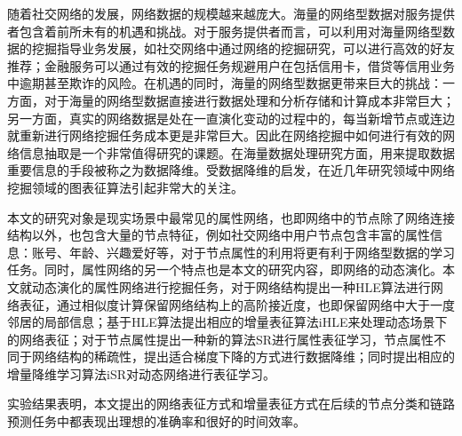 随着社交网络的发展，网络数据的规模越来越庞大。海量的网络型数据对服务提供者包含着前所未有的机遇和挑战。对于服务提供者而言，可以利用对海量网络型数据的挖掘指导业务发展，如社交网络中通过网络的挖掘研究，可以进行高效的好友推荐；金融服务可以通过有效的挖掘任务规避用户在包括信用卡，借贷等信用业务中逾期甚至欺诈的风险。在机遇的同时，海量的网络型数据更带来巨大的挑战：一方面，对于海量的网络型数据直接进行数据处理和分析存储和计算成本非常巨大；另一方面，真实的网络数据是处在一直演化变动的过程中的，每当新增节点或连边就重新进行网络挖掘任务成本更是非常巨大。因此在网络挖掘中如何进行有效的网络信息抽取是一个非常值得研究的课题。在海量数据处理研究方面，用来提取数据重要信息的手段被称之为数据降维。受数据降维的启发，在近几年研究领域中网络挖掘领域的图表征算法引起非常大的关注。

本文的研究对象是现实场景中最常见的属性网络，也即网络中的节点除了网络连接结构以外，也包含大量的节点特征，例如社交网络中用户节点包含丰富的属性信息：账号、年龄、兴趣爱好等，对于节点属性的利用将更有利于网络型数据的学习任务。同时，属性网络的另一个特点也是本文的研究内容，即网络的动态演化。本文就动态演化的属性网络进行挖掘任务，对于网络结构提出一种HLE算法进行网络表征，通过相似度计算保留网络结构上的高阶接近度，也即保留网络中大于一度邻居的局部信息；基于HLE算法提出相应的增量表征算法iHLE来处理动态场景下的网络表征；对于节点属性提出一种新的算法SR进行属性表征学习，节点属性不同于网络结构的稀疏性，提出适合梯度下降的方式进行数据降维；同时提出相应的增量降维学习算法iSR对动态网络进行表征学习。

实验结果表明，本文提出的网络表征方式和增量表征方式在后续的节点分类和链路预测任务中都表现出理想的准确率和很好的时间效率。